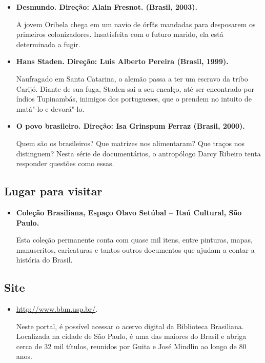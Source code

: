 \documentclass[12pt]{extarticle}
\begin{document}
\begin{itemize}
\item\textbf{Desmundo. Direção: Alain Fresnot. (Brasil, 2003).}

A jovem Oribela chega em um navio de órfãs mandadas para desposarem os
primeiros colonizadores. Insatisfeita com o futuro marido, ela está
determinada a fugir.

\item\textbf{Hans Staden. Direção: Luis Alberto Pereira (Brasil, 1999). }

Naufragado em Santa Catarina, o alemão passa a ter um escravo da tribo
Carijó. Diante de sua fuga, Staden sai a seu encalço, até ser encontrado
por índios Tupinambás, inimigos dos portugueses, que o prendem no
intuito de matá"-lo e devorá"-lo.

\item\textbf{O povo brasileiro. Direção: Isa Grinspum Ferraz (Brasil, 2000).}

Quem são os brasileiros? Que matrizes nos alimentaram? Que traços nos
distinguem? Nesta série de documentários, o antropólogo Darcy Ribeiro
tenta responder questões como essas.
\end{itemize}

\subsection{Lugar para visitar}

\begin{itemize}
\item\textbf{Coleção Brasiliana, Espaço Olavo Setúbal -- Itaú Cultural, São Paulo.}

Esta coleção permanente conta com quase mil itens, entre pinturas,
mapas, manuscritos, caricaturas e tantos outros documentos que ajudam a
contar a história do Brasil.
\end{itemize}

\subsection{Site}

\begin{itemize}
\item\url{http://www.bbm.usp.br/}.

Neste portal, é possível acessar o acervo digital da Biblioteca
Brasiliana. Localizada na cidade de São Paulo, é uma das maiores do
Brasil e abriga cerca de 32 mil títulos, reunidos por Guita e José
Mindlin ao longo de 80 anos.
\end{itemize}
\end{document}
